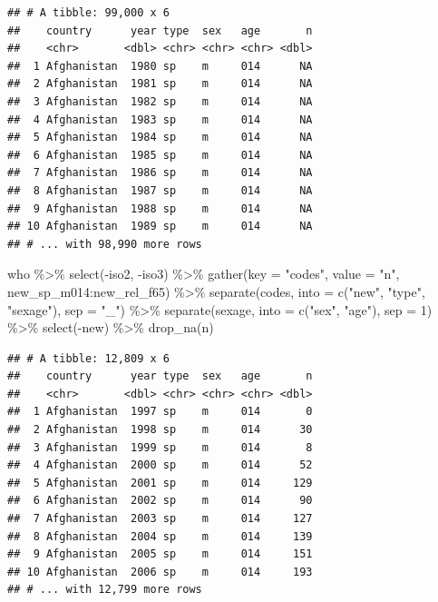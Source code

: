 \documentclass[
]{article}
\newenvironment{Shaded}{\begin{snugshade}}{\end{snugshade}}
\newcommand{\AttributeTok}[1]{\textcolor[rgb]{0.77,0.63,0.00}{#1}}
\newcommand{\DecValTok}[1]{\textcolor[rgb]{0.00,0.00,0.81}{#1}}
\newcommand{\FunctionTok}[1]{\textcolor[rgb]{0.00,0.00,0.00}{#1}}
\newcommand{\NormalTok}[1]{#1}
\newcommand{\SpecialCharTok}[1]{\textcolor[rgb]{0.00,0.00,0.00}{#1}}
\newcommand{\StringTok}[1]{\textcolor[rgb]{0.31,0.60,0.02}{#1}}
\begin{document}
\begin{verbatim}
## # A tibble: 99,000 x 6
##    country      year type  sex   age       n
##    <chr>       <dbl> <chr> <chr> <chr> <dbl>
##  1 Afghanistan  1980 sp    m     014      NA
##  2 Afghanistan  1981 sp    m     014      NA
##  3 Afghanistan  1982 sp    m     014      NA
##  4 Afghanistan  1983 sp    m     014      NA
##  5 Afghanistan  1984 sp    m     014      NA
##  6 Afghanistan  1985 sp    m     014      NA
##  7 Afghanistan  1986 sp    m     014      NA
##  8 Afghanistan  1987 sp    m     014      NA
##  9 Afghanistan  1988 sp    m     014      NA
## 10 Afghanistan  1989 sp    m     014      NA
## # ... with 98,990 more rows
\end{verbatim}

\begin{Shaded}
\begin{Highlighting}[]
\NormalTok{who }\SpecialCharTok{\%\textgreater{}\%}
  \FunctionTok{select}\NormalTok{(}\SpecialCharTok{{-}}\NormalTok{iso2, }\SpecialCharTok{{-}}\NormalTok{iso3) }\SpecialCharTok{\%\textgreater{}\%} 
  \FunctionTok{gather}\NormalTok{(}\AttributeTok{key =} \StringTok{"codes"}\NormalTok{, }\AttributeTok{value =} \StringTok{"n"}\NormalTok{, new\_sp\_m014}\SpecialCharTok{:}\NormalTok{new\_rel\_f65) }\SpecialCharTok{\%\textgreater{}\%} 
  \FunctionTok{separate}\NormalTok{(codes, }\AttributeTok{into =} \FunctionTok{c}\NormalTok{(}\StringTok{"new"}\NormalTok{, }\StringTok{"type"}\NormalTok{, }\StringTok{"sexage"}\NormalTok{), }\AttributeTok{sep =} \StringTok{"\_"}\NormalTok{) }\SpecialCharTok{\%\textgreater{}\%} 
  \FunctionTok{separate}\NormalTok{(sexage, }\AttributeTok{into =} \FunctionTok{c}\NormalTok{(}\StringTok{"sex"}\NormalTok{, }\StringTok{"age"}\NormalTok{), }\AttributeTok{sep =} \DecValTok{1}\NormalTok{) }\SpecialCharTok{\%\textgreater{}\%} 
  \FunctionTok{select}\NormalTok{(}\SpecialCharTok{{-}}\NormalTok{new) }\SpecialCharTok{\%\textgreater{}\%}
  \FunctionTok{drop\_na}\NormalTok{(n)}
\end{Highlighting}
\end{Shaded}

\begin{verbatim}
## # A tibble: 12,809 x 6
##    country      year type  sex   age       n
##    <chr>       <dbl> <chr> <chr> <chr> <dbl>
##  1 Afghanistan  1997 sp    m     014       0
##  2 Afghanistan  1998 sp    m     014      30
##  3 Afghanistan  1999 sp    m     014       8
##  4 Afghanistan  2000 sp    m     014      52
##  5 Afghanistan  2001 sp    m     014     129
##  6 Afghanistan  2002 sp    m     014      90
##  7 Afghanistan  2003 sp    m     014     127
##  8 Afghanistan  2004 sp    m     014     139
##  9 Afghanistan  2005 sp    m     014     151
## 10 Afghanistan  2006 sp    m     014     193
## # ... with 12,799 more rows
\end{verbatim}
\end{document}
